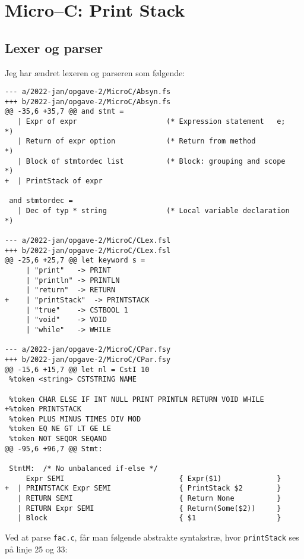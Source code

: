 \section{Micro–C: Print Stack}

\subsection{Lexer og parser}

Jeg har ændret lexeren og parseren som følgende:

\begin{verbatim}
--- a/2022-jan/opgave-2/MicroC/Absyn.fs
+++ b/2022-jan/opgave-2/MicroC/Absyn.fs
@@ -35,6 +35,7 @@ and stmt =
   | Expr of expr                     (* Expression statement   e;   *)
   | Return of expr option            (* Return from method          *)
   | Block of stmtordec list          (* Block: grouping and scope   *)
+  | PrintStack of expr
                                                                    
 and stmtordec =                                                    
   | Dec of typ * string              (* Local variable declaration  *)

--- a/2022-jan/opgave-2/MicroC/CLex.fsl
+++ b/2022-jan/opgave-2/MicroC/CLex.fsl
@@ -25,6 +25,7 @@ let keyword s =
     | "print"   -> PRINT
     | "println" -> PRINTLN
     | "return"  -> RETURN
+    | "printStack"  -> PRINTSTACK
     | "true"    -> CSTBOOL 1
     | "void"    -> VOID 
     | "while"   -> WHILE         

--- a/2022-jan/opgave-2/MicroC/CPar.fsy
+++ b/2022-jan/opgave-2/MicroC/CPar.fsy
@@ -15,6 +15,7 @@ let nl = CstI 10
 %token <string> CSTSTRING NAME
 
 %token CHAR ELSE IF INT NULL PRINT PRINTLN RETURN VOID WHILE
+%token PRINTSTACK
 %token PLUS MINUS TIMES DIV MOD
 %token EQ NE GT LT GE LE
 %token NOT SEQOR SEQAND
@@ -95,6 +96,7 @@ Stmt:
 
 StmtM:  /* No unbalanced if-else */
     Expr SEMI                           { Expr($1)             }
+  | PRINTSTACK Expr SEMI                { PrintStack $2        }
   | RETURN SEMI                         { Return None          }
   | RETURN Expr SEMI                    { Return(Some($2))     }
   | Block                               { $1                   }
\end{verbatim}

Ved at parse \texttt{fac.c}, får man følgende abstrakte syntakstræ, hvor \texttt{printStack} ses på linje 25 og 33:

